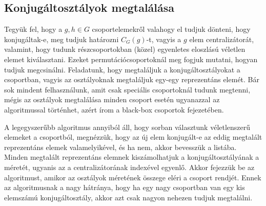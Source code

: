 \subsection{Konjugáltosztályok megtalálása}
\label{subsec:konj}
Tegyük fel, hogy a $g, h \in G$ csoportelemekről valahogy el tudjuk dönteni, hogy konjugáltak-e, meg tudjuk határozni $C_G(g)$-t, vagyis a $g$ elem centralizátorát, valamint,
hogy tudunk részcsoportokban (közel) egyenletes eloszlású véletlen elemet kiválasztani.
Ezeket permutációcsoportoknál meg fogjuk mutatni, hogyan tudjuk megcsinálni.
Feladatunk, hogy megtaláljuk a konjugáltosztályokat a csoportban, vagyis az osztályoknak megtaláljuk egy-egy reprezentáns elemét.
Bár sok mindent felhasználunk, amit csak speciális csoportoknál tudunk megtenni, mégis az osztályok megtalálása minden csoport esetén ugyanazzal az algoritmussal történhet,
azért írom a black-box csoportok fejezetében.

A legegyszerűbb algoritmus annyiból áll, hogy sorban választunk véletlenszerű elemeket a csoportból, megnézzük, hogy az új elem konjugált-e az eddig megtalált reprezentáns elemek valamelyikével,
és ha nem, akkor bevesszük a listába.
Minden megtalált reprezentáns elemnek kiszámolhatjuk a konjugáltosztályának a méretét, ugyanis az a centralizátorának indexével egyenlő.
Akkor fejezzük be az algoritmust, amikor az osztályok méretének összege eléri a csoport rendjét.
Ennek az algoritmusnak a nagy hátránya, hogy ha egy nagy csoportban van egy kis elemszámú konjugáltosztály, akkor azt csak nagyon nehezen tudjuk megtalálni.

